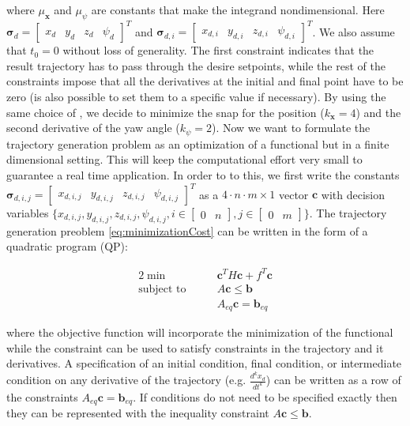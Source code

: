 \noindent where $\mu_{\mathbf{x}}$ and $\mu_{\psi}$ are constants that make the integrand nondimensional. Here $\boldsymbol{\sigma}_d = \begin{bmatrix} x_d & y_d & z_d & \psi_d\end{bmatrix}^T$ and $\boldsymbol{\sigma}_{d,i}=\begin{bmatrix}x_{d,i} & y_{d,i} & z_{d,i} & \psi_{d,i}\end{bmatrix}^T$. We also assume that $t_0=0$ without loss of generality. The first constraint indicates that the result trajectory has to pass through the desire setpoints, while the rest of the constraints impose that all the derivatives at the initial and final point have to be zero (is also possible to set them to a specific value if necessary). By using the same choice of \cite{minimumSnap2}, we decide to minimize the snap for the position ($k_{\mathbf{x}}=4$) and the second derivative of the yaw angle ($k_{\psi}=2$). Now we want to formulate the trajectory generation problem as an optimization of a functional but in a finite dimensional setting. This will keep the computational effort very small to guarantee a real time application. In order to to this, we first write the constants $\boldsymbol{\sigma}_{d,i,j} =\begin{bmatrix}x_{d,i,j} & y_{d,i,j} & z_{d,i,j} & \psi_{d,i,j}\end{bmatrix}^T$ as a $4\cdot n\cdot m\times 1$ vector $\mathbf{c}$ with decision variables $\{x_{d,i,j} , y_{d,i,j} , z_{d,i,j} , \psi_{d,i,j}, i \in \begin{bmatrix}0 & n\end{bmatrix}, j \in \begin{bmatrix}0 & m\end{bmatrix}\}$. The trajectory generation preoblem \eqref{eq:minimizationCost} can be written in the form of a quadratic program (QP):

\begin{alignat}{2}
	\min\qquad & \mathbf{c}^TH\mathbf{c} + f^T\mathbf{c} \\
	\text{subject to}\qquad & A\mathbf{c} \le \mathbf{b} \nonumber \\
	& A_{eq}\mathbf{c} = \mathbf{b}_{eq} \nonumber
	\label{eq:quadraticProgram}
\end{alignat}

\noindent where the objective function will incorporate the minimization of the functional while the constraint can be used to satisfy constraints in the trajectory and it derivatives. A specification of an initial condition, final condition, or intermediate condition on any derivative of the trajectory (e.g. $\frac{d^kx_d}{dt^k}$) can be written as a row of the constraints $A_{eq}\mathbf{c} = \mathbf{b}_{eq}$. If conditions do not need to be
specified exactly then they can be represented with the inequality constraint $A\mathbf{c}\le \mathbf{b}$.

